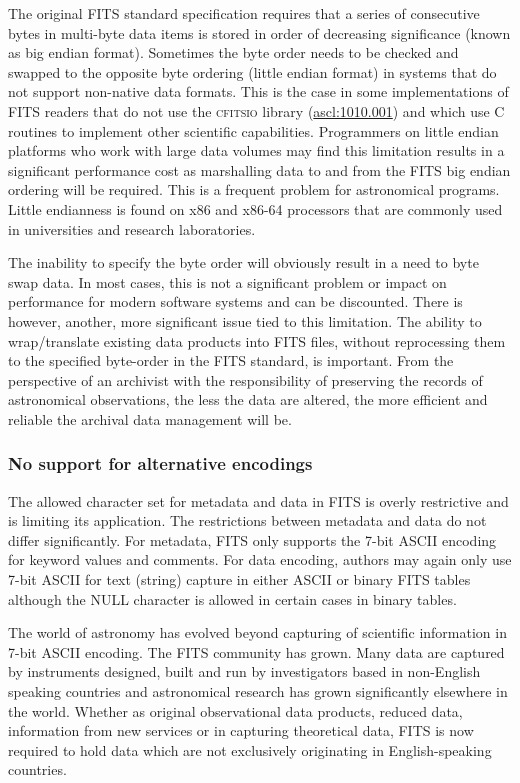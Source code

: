 \documentclass[final,authoryear,5p,times,twocolumn]{elsarticle}
\begin{document}
{{The original FITS standard specification \citep{1981A&AS...44..363W}
requires that a series of consecutive bytes in multi-byte data items is
stored in order of decreasing significance (known as big endian format).
Sometimes the byte order needs to be checked and swapped to the opposite
byte ordering (little endian format) in systems that do not support
non-native data formats.  This is the case in some implementations of FITS
readers that do not use the \textsc{cfitsio} library
(\href{http://ascl.net/1010.001}{ascl:1010.001}) and which use C routines
to implement other scientific capabilities.  Programmers on little endian
platforms who work with large data volumes may find this limitation
results in a significant performance cost as marshalling data to and from
the FITS big endian ordering will be required.  This is a frequent problem
for astronomical programs. Little endianness is found on x86 and x86-64
processors that are commonly used in universities and research
laboratories.


The inability to specify the byte order will obviously result in a 
need to byte swap data. In most cases, this is not a significant
problem or impact on performance for modern software systems and
can be discounted. There is however, another, more significant issue
tied to this limitation. The ability to wrap/translate existing data products 
into FITS files, without reprocessing them to the specified
byte-order in the FITS standard, is important. From
the perspective of an archivist with the responsibility of preserving the
records of astronomical observations, the less the data are altered, the
more efficient and reliable the archival data management will be.


\subsubsection{No support for alternative encodings}
\label{section_char_encoding}

The allowed character set for metadata and data in FITS is overly
restrictive and is limiting its application. The restrictions between
metadata and data do not differ significantly. For metadata, 
FITS only supports the 7-bit
ASCII encoding for keyword values and comments. For data encoding,
authors may again only use 7-bit ASCII for text (string) capture in
either ASCII or binary FITS tables although the NULL character is
allowed in certain cases in binary tables.


The world of astronomy has evolved beyond capturing of scientific
information in 7-bit ASCII encoding. The FITS community has grown.
Many data are captured by instruments designed, built and run by
investigators based in non-English speaking countries and astronomical
research has grown significantly elsewhere in the world. Whether as
original observational data products, reduced data, information from new
services or in capturing theoretical data, FITS is now required to hold
data which are not exclusively originating in English-speaking countries.


}}
\end{document}
